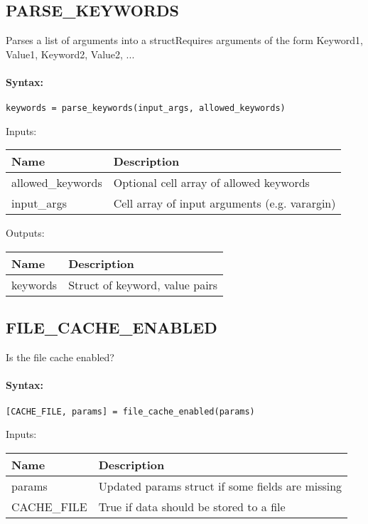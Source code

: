 \subsection{PARSE\_KEYWORDS}

Parses a list of arguments into a structRequires arguments of the form Keyword1, Value1, Keyword2, Value2, ...

\paragraph{Syntax:} \verb|keywords = parse_keywords(input_args, allowed_keywords)|

\bigskip
Inputs:

\begin{tabular}{|p{}|p{}|}
\hline
\textbf{Name} & \textbf{Description} \\
\hline \hline
allowed\_keywords & Optional cell array of allowed keywords  \\ \hline
input\_args & Cell array of input arguments (e.g. varargin)  \\ \hline
\end{tabular}

\bigskip
Outputs:

\begin{tabular}{|p{}|p{}|}
\hline
\textbf{Name} & \textbf{Description} \\
\hline \hline
keywords & Struct of keyword, value pairs  \\ \hline
\end{tabular}

\subsection{FILE\_CACHE\_ENABLED}

Is the file cache enabled?

\paragraph{Syntax:} \verb|[CACHE_FILE, params] = file_cache_enabled(params)|

\bigskip
Inputs:

\begin{tabular}{|p{}|p{}|}
\hline
\textbf{Name} & \textbf{Description} \\
\hline \hline
params & Updated params struct if some fields are missing  \\ \hline
CACHE\_FILE & True if data should be stored to a file  \\ \hline
\end{tabular}

